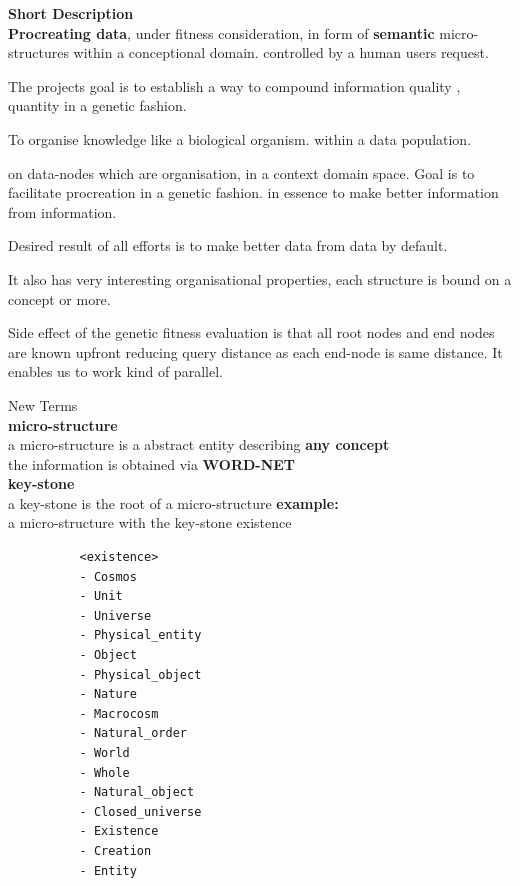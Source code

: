 \documentclass[15pt]{article}
\begin{document}
\begin{center}


{\bf Short Description} \\[0.4cm]

\textbf{Procreating data}, under fitness consideration,
      in form of \textbf{semantic} micro-structures 
      within a conceptional domain.
      controlled by a human users request.
\vskip0.5cm


\begin{flushleft}


The projects goal is to establish a way to compound information quality  , quantity in a genetic fashion.

\vskip0.5cm

To organise knowledge like a biological organism. within a data population.

on data-nodes which are organisation,
in a context domain space.
Goal is to facilitate procreation in a genetic fashion. in essence to make better information from information.

Desired result of all efforts is to make better data from data by default.

It also has very interesting organisational properties,
each structure is bound on a concept or more.

Side effect of the genetic fitness evaluation
is that all root nodes and end nodes are known upfront reducing
query distance as each end-node is same distance.
It enables us to work kind of parallel.

\end{flushleft}




{\small New Terms } \\[0.1cm]
\textbf
{micro-structure}\\  
a micro-structure is a abstract entity describing 
\textbf{any concept}\\
the information is obtained via \textbf{WORD-NET}\\
\vskip0.4cm
\textbf
{key-stone}\\  
a key-stone is the root of a micro-structure 
\vskip0.4cm
\textbf
{example:}\\  
a micro-structure with the key-stone existence
\vskip0.2cm

\end{center}


          \begin{verbatim}
          <existence>
          - Cosmos
          - Unit
          - Universe
          - Physical_entity
          - Object
          - Physical_object
          - Nature
          - Macrocosm
          - Natural_order
          - World
          - Whole
          - Natural_object
          - Closed_universe
          - Existence
          - Creation
          - Entity
          \end{verbatim}
\end{document}

